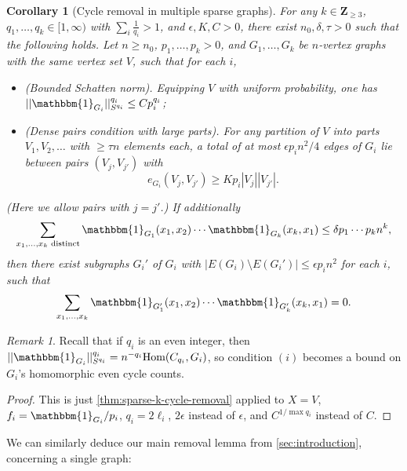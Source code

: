 \documentclass[reqno,11pt]{amsart}
\newtheorem{corollary}[theorem]{Corollary}
\theoremstyle{definition}
\theoremstyle{remark}
\newtheorem*{remark}{Remark}
\numberwithin{equation}{section}
\newcommand{\Z}{\mathbf{Z}}
\newcommand{\one}{\mathbbm{1}}
\newcommand{\Hom}{\textnormal{Hom}}
\begin{document}
\begin{corollary}[Cycle removal in multiple sparse graphs] \label{cor:sparse-k-cycle-removal-graphs}
For any $k \in \Z_{\ge 3}$, $q_1, \ldots, q_k \in [1, \infty)$ with $\sum_i \frac{1}{q_i} > 1$, and $\epsilon, K, C > 0$, there exist $n_0, \delta, \tau > 0$ such that the following holds. Let $n \ge n_0$, $p_1, \ldots, p_k > 0$, and $G_1, \ldots, G_k$ be $n$-vertex graphs with the same vertex set $V$, such that for each $i$,
\begin{itemize}
    \item[$(i)$] \emph{(Bounded Schatten norm).} Equipping $V$ with uniform probability, one has $||\one_{G_i}||_{S^{q_i}}^{q_i} \le C p_i^{q_i}$;
    \item[$(ii)$] \emph{(Dense pairs condition with large parts).} For any partition of $V$ into parts $V_1, V_2, \ldots$ with $\ge \tau n$ elements each, a total of at most $\epsilon p_i n^2/4$ edges of $G_i$ lie between pairs $(V_j, V_{j'})$ with 
    \[
        e_{G_i}(V_j, V_{j'}) \ge Kp_i|V_j||V_{j'}|.
    \]
\end{itemize}
(Here we allow pairs with $j = j'$.) If additionally
\[
    \sum_{x_1, \ldots, x_k \text{ distinct}} \one_{G_1}(x_1, x_2) \cdots \one_{G_k}(x_k, x_1) \le \delta p_1 \cdots p_k n^k,
\]
then there exist subgraphs $G_i'$ of $G_i$ with $|E(G_i) \setminus E(G_i')| \le \epsilon p_i n^2$ for each $i$, such that
\[
    \sum_{x_1, \ldots, x_k} \one_{G_1'}(x_1, x_2) \cdots \one_{G_k'}(x_k, x_1) = 0.
\]
\end{corollary}

\begin{remark}
Recall that if $q_i$ is an even integer, then $||\one_{G_i}||_{S^{q_i}}^{q_i} = n^{-q_i} \Hom(C_{q_i}, G_i)$, so condition $(i)$ becomes a bound on $G_i$'s homomorphic even cycle counts.
\end{remark}

\begin{proof}
This is just \cref{thm:sparse-k-cycle-removal} applied to $X = V$, $f_i = \one_{G_i}/p_i$, $q_i = 2\ell_i$, $2\epsilon$ instead of $\epsilon$, and $C^{1/\max q_i}$ instead of $C$.
\end{proof}

We can similarly deduce our main removal lemma from \cref{sec:introduction}, concerning a single graph:
\end{document}
